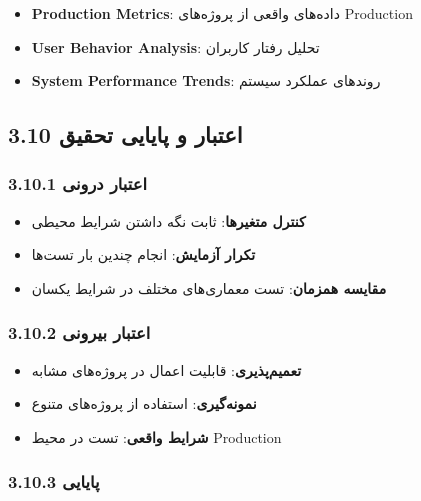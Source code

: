 \documentclass[
]{article}
\providecommand{\tightlist}{%
  \setlength{\itemsep}{0pt}\setlength{\parskip}{0pt}}
\begin{document}
\begin{itemize}
\tightlist
\item
  \textbf{Production Metrics}: داده‌های واقعی از پروژه‌های Production
\item
  \textbf{User Behavior Analysis}: تحلیل رفتار کاربران
\item
  \textbf{System Performance Trends}: روندهای عملکرد سیستم
\end{itemize}

\subsection{3.10 اعتبار و پایایی
تحقیق}\label{ux627ux639ux62aux628ux627ux631-ux648-ux67eux627ux6ccux627ux6ccux6cc-ux62aux62dux642ux6ccux642}

\subsubsection{3.10.1 اعتبار
درونی}\label{ux627ux639ux62aux628ux627ux631-ux62fux631ux648ux646ux6cc}

\begin{itemize}
\tightlist
\item
  \textbf{کنترل متغیرها}: ثابت نگه داشتن شرایط محیطی
\item
  \textbf{تکرار آزمایش}: انجام چندین بار تست‌ها
\item
  \textbf{مقایسه همزمان}: تست معماری‌های مختلف در شرایط یکسان
\end{itemize}

\subsubsection{3.10.2 اعتبار
بیرونی}\label{ux627ux639ux62aux628ux627ux631-ux628ux6ccux631ux648ux646ux6cc}

\begin{itemize}
\tightlist
\item
  \textbf{تعمیم‌پذیری}: قابلیت اعمال در پروژه‌های مشابه
\item
  \textbf{نمونه‌گیری}: استفاده از پروژه‌های متنوع
\item
  \textbf{شرایط واقعی}: تست در محیط Production
\end{itemize}

\subsubsection{3.10.3 پایایی}\label{ux67eux627ux6ccux627ux6ccux6cc}
\end{document}
